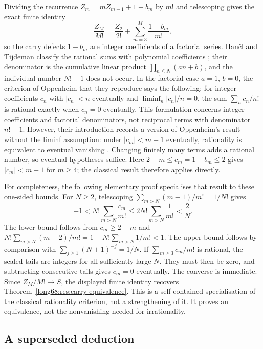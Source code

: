 Dividing the recurrence $Z_m=mZ_{m-1}+1-b_m$ by $m!$ and
telescoping gives the exact finite identity
\[
 \frac{Z_M}{M!}=\frac{Z_2}{2!}+\sum_{m=3}^{M}\frac{1-b_m}{m!},
\]
so the carry defects $1-b_m$ are integer coefficients of a factorial series.
Han\v{c}l and Tijdeman classify the rational sums with polynomial coefficients
\cite[Thm.~3.1 and Cor.~3.1, pp.~390--391]{hancl-tijdeman}; their
denominator is the cumulative linear product $\prod_{n\le N}(an+b)$, and the
individual number $N!-1$ does not occur.  In the factorial case $a=1$, $b=0$, the criterion of Oppenheim that they
reproduce \cite[Lem.~2.2, p.~385]{hancl-tijdeman} says the following: for
integer coefficients $c_n$ with $|c_n|<n$ eventually and
$\liminf_n|c_n|/n=0$, the sum $\sum_n c_n/n!$ is rational exactly when
$c_n=0$ eventually. This formulation concerns integer coefficients and
factorial denominators, not reciprocal terms with denominator $n!-1$.
However, their introduction records a version of Oppenheim's result
without the liminf assumption: under $|c_m|<m-1$ eventually, rationality
is equivalent to eventual vanishing
\cite[Introduction, p.~383]{hancl-tijdeman}. Changing finitely many terms
adds a rational number, so eventual hypotheses suffice. Here
$2-m\le c_m=1-b_m\le2$ gives $|c_m|<m-1$ for $m\ge4$; the classical
result therefore applies directly.

For completeness, the following elementary proof specialises that result
to these one-sided bounds. For $N\ge2$, telescoping
$\sum_{m>N}(m-1)/m!=1/N!$ gives
\[
 -1<N!\sum_{m>N}\frac{c_m}{m!}
 \le2N!\sum_{m>N}\frac1{m!}<\frac2N.
\]
The lower bound follows from $c_m\ge2-m$ and
$N!\sum_{m>N}(m-2)/m!=1-N!\sum_{m>N}1/m!<1$.
The upper bound follows by comparison with
$\sum_{j\ge1}(N+1)^{-j}=1/N$.
If $\sum_{m\ge3}c_m/m!$ is rational, the scaled tails are integers for all
sufficiently large $N$. They must then be zero, and subtracting consecutive
tails gives $c_m=0$ eventually. The converse is immediate. Since
$Z_M/M!\to S$, the displayed finite identity recovers
Theorem~\ref{long68:res:carry-equivalence}. This is a self-contained
specialisation of the classical rationality criterion, not a strengthening
of it. It proves an equivalence, not the nonvanishing needed for irrationality.

\subsection{A superseded deduction}\label{long68:sec:ext-superseded}

